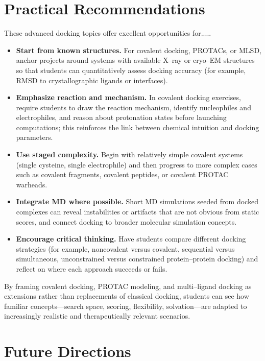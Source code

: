 \documentclass[12pt]{article}
\begin{document}
\section{Practical Recommendations}

 These advanced docking topics offer excellent opportunities for.....

\begin{itemize}
  \item \textbf{Start from known structures.} For covalent docking, PROTACs, or MLSD, anchor projects around systems with available X–ray or cryo–EM structures so that students can quantitatively assess docking accuracy (for example, RMSD to crystallographic ligands or interfaces).  
  \item \textbf{Emphasize reaction and mechanism.} In covalent docking exercises, require students to draw the reaction mechanism, identify nucleophiles and electrophiles, and reason about protonation states before launching computations; this reinforces the link between chemical intuition and docking parameters.  
  \item \textbf{Use staged complexity.} Begin with relatively simple covalent systems (single cysteine, single electrophile) and then progress to more complex cases such as covalent fragments, covalent peptides, or covalent PROTAC warheads.  
  \item \textbf{Integrate MD where possible.} Short MD simulations seeded from docked complexes can reveal instabilities or artifacts that are not obvious from static scores, and connect docking to broader molecular simulation concepts.  
  \item \textbf{Encourage critical thinking.} Have students compare different docking strategies (for example, noncovalent versus covalent, sequential versus simultaneous, unconstrained versus constrained protein–protein docking) and reflect on where each approach succeeds or fails.
\end{itemize}

By framing covalent docking, PROTAC modeling, and multi–ligand docking as extensions rather than replacements of classical docking, students can see how familiar concepts—search space, scoring, flexibility, solvation—are adapted to increasingly realistic and therapeutically relevant scenarios.

\section{Future Directions}
\end{document}
